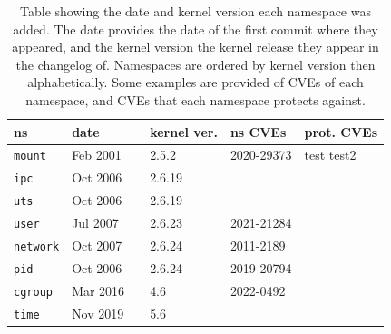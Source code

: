 \documentclass[12pt,a4paper,twoside]{report}
\begin{document}
\begin{table}
    \caption{Table showing the date and kernel version each namespace was added. The date provides the date of the first commit where they appeared, and the kernel version the kernel release they appear in the changelog of. Namespaces are ordered by kernel version then alphabetically. Some examples are provided of CVEs of each namespace, and CVEs that each namespace protects against.}

    \begin{center}
    \begin{tabular}{l|lr|lr|l|l}
        ns & \multicolumn{2}{l}{date} & \multicolumn{2}{|l|}{kernel ver.} & ns CVEs & prot. CVEs \\ \hline

        \texttt{mount}
            & Feb 2001 & \citep{viro_patchcft_2001}
            & 2.5.2 & \citep{torvalds_linux_2002}
            & 2020-29373
            & test \newline test2 \\

        \texttt{ipc}
            & Oct 2006 & \citep{korotaev_patch_2006}
            & 2.6.19 & \citep{linux_kernel_newbies_editors_linux_2006}
            &
            & \\

        \texttt{uts}
            & Oct 2006 & \citep{hallyn_patch_2006}
            & 2.6.19 & \citep{linux_kernel_newbies_editors_linux_2006}
            &
            & \\

        \texttt{user}
            & Jul 2007 & \citep{le_goater_user_2007}
            & 2.6.23 & \citep{linux_kernel_newbies_editors_linux_2007}
            & 2021-21284
            & \\

        \texttt{network}
            & Oct 2007 & \citep{biederman_net_2007}
            & 2.6.24 & \citep{linux_kernel_newbies_editors_linux_2008}
            & 2011-2189
            & \\

        \texttt{pid}
            & Oct 2006 & \citep{bhattiprolu_patch_2006}
            & 2.6.24 & \citep{linux_kernel_newbies_editors_linux_2008}
            & 2019-20794
            & \\

        \texttt{cgroup}
            & Mar 2016 & \citep{heo_git_2016}
            & 4.6 & \citep{torvalds_linux_2016}
            & 2022-0492
            & \\

        \texttt{time}
            & Nov 2019 & \citep{vagin_ns_2020}
            & 5.6 & \citep{linux_kernel_newbies_editors_linux_2020}
            &
            &

    \end{tabular}
    \end{center}

    \label{tab:namespaces}
\end{table}
\end{document}
